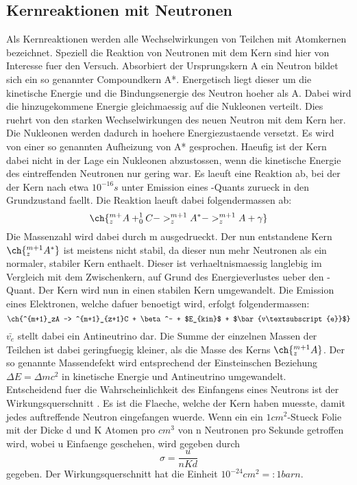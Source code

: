 \documentclass[titlepage=firstcover, captions=tableheading]{scrartcl}
\let\ce\ch
\begin{document}
\subsection{Kernreaktionen mit Neutronen}
Als Kernreaktionen werden alle Wechselwirkungen von Teilchen mit Atomkernen bezeichnet. Speziell die Reaktion von Neutronen mit dem Kern sind hier von Interesse fuer den Versuch. Absorbiert der Ursprungskern A ein Neutron bildet sich ein so genannter Compoundkern A*. Energetisch liegt dieser um die kinetische Energie und die Bindungsenergie des Neutron hoeher als A. Dabei wird die hinzugekommene Energie gleichmaessig auf die Nukleonen verteilt. Dies ruehrt von den starken Wechselwirkungen des neuen Neutron mit dem Kern her. Die Nukleonen werden dadurch in hoehere Energiezustaende versetzt. Es wird von einer so genannten Aufheizung von A* gesprochen. Haeufig ist der Kern dabei nicht in der Lage ein Nukleonen abzustossen, wenn die kinetische Energie des eintreffenden Neutronen nur gering war. Es laeuft eine Reaktion ab, bei der der Kern nach etwa $10^{-16}s$ unter Emission eines \gamma-Quants zurueck in den Grundzustand faellt. Die Reaktion laeuft dabei folgendermassen ab:
\begin{equation}
    \ce{^{m+}_zA + ^{1}_{0}C -> ^{m+1}_zA^{*} -> ^{m+1}_zA + \gamma} \nonumber
\end{equation}
Die Massenzahl wird dabei durch m ausgedrueckt. Der nun entstandene Kern $\ce{^{m+1}_{z}A^{*}}$ ist meistens nicht stabil, da dieser nun mehr Neutronen als ein normaler, stabiler Kern enthaelt. Dieser ist verhaeltnismaessig langlebig im Vergleich mit dem Zwischenkern, auf Grund des Energieverlustes ueber den \gamma-Quant. Der Kern wird nun in einen stabilen Kern umgewandelt. Die Emission eines Elektronen, welche dafuer benoetigt wird, erfolgt folgendermassen:
\begin{equation}
    \ce{^{m+1}_zA -> ^{m+1}_{z+1}C + \beta^- + $E_{kin}$ + $\bar{v\textsubscript{e}}$} \nonumber
\end{equation}
$\bar{v_e}$ stellt dabei ein Antineutrino dar. Die Summe der einzelnen Massen der Teilchen ist dabei geringfuegig kleiner, als die Masse des Kerns $\ce{^{m+1}_zA}$. Der so genannte Massendefekt wird entsprechend der Einsteinschen Beziehung $\Delta E= \Delta mc^{2}$ in kinetische Energie und Antineutrino umgewandelt.\\
Entscheidend fuer die Wahrscheinlichkeit des Einfangens eines Neutrons ist der Wirkungsquerschnitt \sigma. Es ist die Flaeche, welche der Kern haben muesste, damit jedes auftreffende Neutron eingefangen wuerde. Wenn ein ein $1cm^2$-Stueck Folie mit der Dicke d und K Atomen pro $cm^3$ von n Neutronen pro Sekunde getroffen wird, wobei u Einfaenge geschehen, wird \sigma gegeben durch
\begin{equation}
    \sigma =\frac{u}{nKd} \nonumber
\end{equation}
gegeben. Der Wirkungsquerschnitt hat die Einheit $10^{-24}cm^2=:1 barn$.
\end{document}
